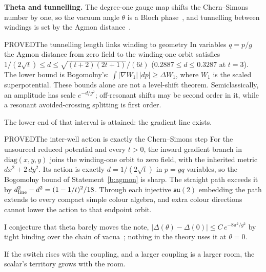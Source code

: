 \textbf{Theta and tunnelling.} The degree-one gauge map shifts the Chern--Simons number by one, so the vacuum angle
$\theta$ is a Bloch phase~\cite{JackiwRebbi76,CallanDashenGross76}, and tunnelling between windings is set by the Agmon
distance~\cite{Agmon82,Simon83}.

\begin{claim}{PROVED}{The tunnelling length links winding to geometry}\label{b:agmon}
In variables $q=p/g$ the Agmon distance from zero field to the winding-one orbit satisfies
$1/(2\sqrt t)\le d\le\sqrt{(t+2)(2t+1)}/(6t)$ ($0.2887\le d\le0.3287$ at $t=3$).
The lower bound is Bogomolny's: $\int|\nabla W_1|\,|dp|\ge\Delta W_1$, where $W_1$ is the scaled superpotential.
These bounds alone are not a level-shift theorem. Semiclassically, an amplitude has scale $e^{-d/g^2}$;
off-resonant shifts may be second order in it, while a resonant avoided-crossing splitting is first order.
\end{claim}

The lower end of that interval is attained: the gradient line exists.

\begin{claim}{PROVED}{The inter-well action is exactly the Chern--Simons step}\label{b:interwell}
For the unsourced reduced potential and every $t>0$, the inward gradient branch in $\mathrm{diag}(x,y,y)$ joins the
winding-one orbit to zero field, with the inherited metric $dx^2+2\,dy^2$. Its action is exactly $d=1/(2\sqrt t)$ in
$p=gq$ variables, so the Bogomolny bound of Statement~\ref{b:agmon} is sharp. The straight path exceeds it by
$d_{\rm line}^2-d^2=(1-1/t)^2/18$. Through each injective $\mathfrak{su}(2)$ embedding the path extends to every
compact simple colour algebra, and extra colour directions cannot lower the action to that endpoint orbit.
\end{claim}

I conjecture that theta barely moves the note, $|\Delta(\theta)-\Delta(0)|\le C\,e^{-8\pi^2/g^2}$ by tight binding over
the chain of vacua~\cite{tHooft76}; nothing in the theory uses it at $\theta=0$.

If the switch rises with the coupling, and a larger coupling is a larger room, the scalar's territory grows with the room.

